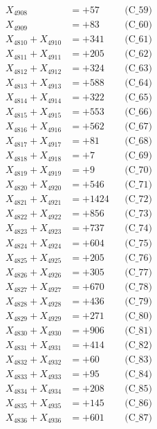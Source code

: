 \documentclass[a4paper,10pt]{article}
\begin{document}
{\begin{align}
X_{4908} &= +57 && \text{(C\_59)} \\
X_{4909} &= +83 && \text{(C\_60)} \\
\allowbreak
X_{4810} + X_{4910} &= +341 && \text{(C\_61)} \\
X_{4811} + X_{4911} &= +205 && \text{(C\_62)} \\
X_{4812} + X_{4912} &= +324 && \text{(C\_63)} \\
X_{4813} + X_{4913} &= +588 && \text{(C\_64)} \\
X_{4814} + X_{4914} &= +322 && \text{(C\_65)} \\
\allowbreak
X_{4815} + X_{4915} &= +553 && \text{(C\_66)} \\
X_{4816} + X_{4916} &= +562 && \text{(C\_67)} \\
X_{4817} + X_{4917} &= +81 && \text{(C\_68)} \\
X_{4818} + X_{4918} &= +7 && \text{(C\_69)} \\
X_{4819} + X_{4919} &= +9 && \text{(C\_70)} \\
\allowbreak
X_{4820} + X_{4920} &= +546 && \text{(C\_71)} \\
X_{4821} + X_{4921} &= +1424 && \text{(C\_72)} \\
X_{4822} + X_{4922} &= +856 && \text{(C\_73)} \\
X_{4823} + X_{4923} &= +737 && \text{(C\_74)} \\
X_{4824} + X_{4924} &= +604 && \text{(C\_75)} \\
\allowbreak
X_{4825} + X_{4925} &= +205 && \text{(C\_76)} \\
X_{4826} + X_{4926} &= +305 && \text{(C\_77)} \\
X_{4827} + X_{4927} &= +670 && \text{(C\_78)} \\
X_{4828} + X_{4928} &= +436 && \text{(C\_79)} \\
X_{4829} + X_{4929} &= +271 && \text{(C\_80)} \\
\allowbreak
X_{4830} + X_{4930} &= +906 && \text{(C\_81)} \\
X_{4831} + X_{4931} &= +414 && \text{(C\_82)} \\
X_{4832} + X_{4932} &= +60 && \text{(C\_83)} \\
X_{4833} + X_{4933} &= +95 && \text{(C\_84)} \\
X_{4834} + X_{4934} &= +208 && \text{(C\_85)} \\
\allowbreak
X_{4835} + X_{4935} &= +145 && \text{(C\_86)} \\
X_{4836} + X_{4936} &= +601 && \text{(C\_87)} \\

\end{align}}
\end{document}
